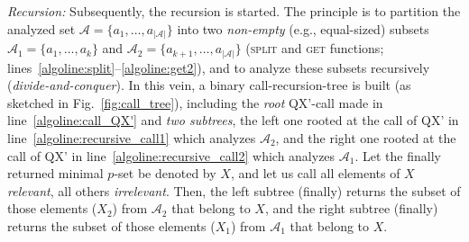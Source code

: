 \documentclass[]{elsarticle}
\newcommand{\ma}{\mathcal{A}}
\begin{document}
	\noindent \emph{Recursion:} Subsequently, the recursion is started. The principle is to partition the analyzed set $\ma = \{a_1,\dots,a_{|\ma|}\}$ into two \emph{non-empty} (e.g., equal-sized) subsets $\ma_1 = \{a_1,\dots,a_k\}$ and $\ma_2=\{a_{k+1},\dots,a_{|\ma|}\}$ (\textsc{split} and \textsc{get} functions; lines~\ref{algoline:split}--\ref{algoline:get2}), and to analyze these subsets recursively (\emph{divide-and-conquer}). In this vein, a binary call-recursion-tree is built (as sketched in Fig.~\ref{fig:call_tree}), including the \emph{root} QX'-call made in line~\ref{algoline:call_QX'} and \emph{two subtrees}, the left one rooted at the call of QX' in line~\ref{algoline:recursive_call1} which analyzes $\ma_2$, and the right one rooted at the call of QX' in line~\ref{algoline:recursive_call2} which analyzes $\ma_1$.
	Let the finally returned minimal $p$-set be denoted by $X$, and let us call all elements of $X$ \emph{relevant}, all others \emph{irrelevant}.
	Then, the left subtree (finally) returns the subset of those elements ($X_2$) from $\ma_2$ that belong to $X$, and the right subtree (finally) returns the subset of those elements ($X_1$) from $\ma_1$ that belong to $X$. 
\end{document}

